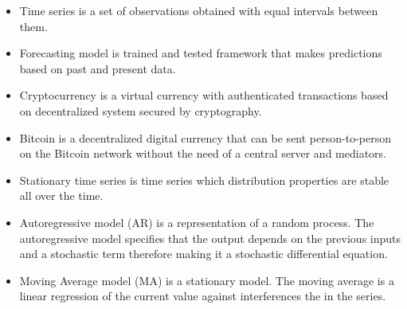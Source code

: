 \begin{itemize}
    \item Time series is a set of observations obtained with equal intervals between them.
    \item  Forecasting model is trained and tested framework that makes predictions based on past and present data.
    \item Cryptocurrency is a virtual currency with authenticated transactions based on decentralized system secured by cryptography. 
    \item Bitcoin is a decentralized digital currency that can be sent person-to-person on the Bitcoin network without the need of a central server and mediators. 
    \item Stationary time series is time series which distribution properties are stable all over the time.
    \item Autoregressive model (AR) is a representation of a random process. The autoregressive model specifies that the output depends on the previous inputs and a stochastic term therefore making it a stochastic differential equation. 
    \item Moving Average model (MA) is a stationary model. The moving average is a linear regression of the current value against interferences the in the series. 
\end{itemize}

 
 